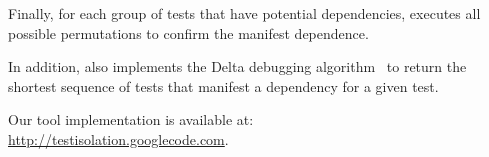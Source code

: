 Finally, for each group of tests that have potential
dependencies, \ourtool executes all possible permutations
to confirm the manifest dependence. 




In addition, \ourtool also implements the Delta debugging algorithm~\cite{Zeller:2002}
to return the shortest sequence of tests that manifest a dependency
for a given test.

Our tool implementation is available at: \\\url{http://testisolation.googlecode.com}.


